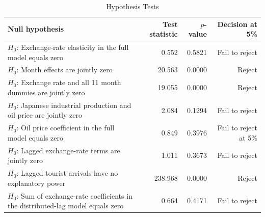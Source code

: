 \begin{table}[H]
\centering
\caption{Hypothesis Tests}
\label{tab:hypothesis}
\begin{tabular}{p{6.1cm}rrr}
\toprule
Null hypothesis & Test statistic & $p$-value & Decision at 5\% \\
\midrule
$H_0$: Exchange-rate elasticity in the full model equals zero & 0.552 & 0.5821 & Fail to reject \\
$H_0$: Month effects are jointly zero & 20.563 & 0.0000 & Reject \\
$H_0$: Exchange rate and all 11 month dummies are jointly zero & 19.055 & 0.0000 & Reject \\
$H_0$: Japanese industrial production and oil price are jointly zero & 2.084 & 0.1294 & Fail to reject \\
$H_0$: Oil price coefficient in the full model equals zero & 0.849 & 0.3976 & Fail to reject at 5\% \\
$H_0$: Lagged exchange-rate terms are jointly zero & 1.011 & 0.3673 & Fail to reject \\
$H_0$: Lagged tourist arrivals have no explanatory power & 238.968 & 0.0000 & Reject \\
$H_0$: Sum of exchange-rate coefficients in the distributed-lag model equals zero & 0.664 & 0.4171 & Fail to reject \\
\bottomrule
\end{tabular}
\end{table}
